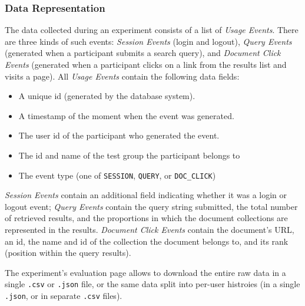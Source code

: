 \documentclass[fleqn]{article}
\begin{document}
\subsubsection{Data Representation}

The data collected during an experiment consists of a list of \emph{Usage Events}. There are three kinds of such events:
\emph{Session Events} (login and logout), \emph{Query Events} (generated when a participant submits a search query),
and \emph{Document Click Events} (generated when a participant clicks on a link from the results list and visits a page).
All \emph{Usage Events} contain the following data fields:

\begin{itemize}

\item A unique id (generated by the database system).

\item A timestamp of the moment when the event was generated.

\item The user id of the participant who generated the event.

\item The id and name of the test group the participant belongs to

\item The event type (one of \texttt{SESSION}, \texttt{QUERY}, or \texttt{DOC\_CLICK})

\end{itemize}

\emph{Session Events} contain an additional field indicating whether it was a login or logout event; 
\emph{Query Events} contain the query string submitted, the total number of retrieved results, and the proportions
in which the document collections are represented in the results.
\emph{Document Click Events} contain the document's URL, an id, the name and id of the collection the document belongs to,
and its rank (position within the query results). 

The experiment's evaluation page allows to download the entire raw data in a single \texttt{.csv} or \texttt{.json} file, 
or the same data split into per-user histroies (in a single \texttt{.json}, or in separate \texttt{.csv} files).
\end{document}
